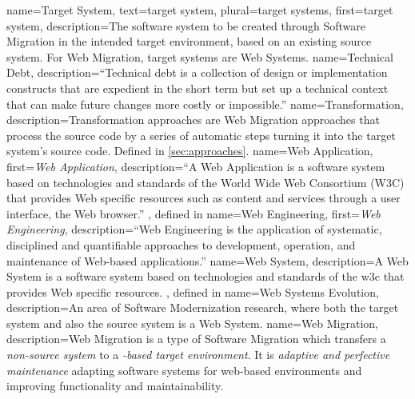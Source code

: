 {
  name=Target System,
  text=target system,
  plural=target systems,
  first={target system}, 
  description={The software system to be created through \gls{Software Migration} in the intended \gls{target environment}, based on an existing \gls{source system}. For \gls{Web Migration}, target systems are \glspl{Web System}.}
}
 {
  name=Technical Debt,
  description={``Technical debt is a collection of design or implementation constructs that are expedient in the short term but set up a technical context that can make future changes more costly or impossible.'' \autocite{Avgeriou2016TD}}
}
 {
  name=Transformation,
  description={Transformation approaches are \gls{Web Migration} approaches that process the  source code by a series of automatic steps turning it into the target system's source code. Defined in \cref{sec:approaches}}.
}
 {
  name=Web Application,
  first={\emph{Web Application}},
  description={``A Web Application is a software system based on technologies and standards of the World Wide Web Consortium (W3C) that provides Web specific resources such as content and services through a user interface, the Web browser.'' \autocite{Kappel2006WebEngineering}, defined in }
}
 {
  name=Web Engineering,
  first={\emph{Web Engineering}},
  description={``Web Engineering is the application of systematic, disciplined and quantifiable approaches to development, operation, and maintenance of Web-based applications.'' \autocite{Deshpande2002WebEngineering}}
}
 {
  name=Web System,
  description={A Web System is a software system based on technologies and standards of the \gls{w3c} that provides Web specific resources. \autocite[adapted from][]{Gaedke2000Diss,Kappel2006WebEngineering}, defined in }
}
 {
  name=Web Systems Evolution,
  description={An area of \gls{Software Modernization} research, where both the target system and also the source system is a \gls{Web System}. \autocite[cf.][]{Kienle2014EvolutionWeb}}
}
 {
  name=Web Migration,
  description={Web Migration is a type of \gls{Software Migration} which transfers a \emph{non-\web source system} to a \emph{\web-based target environment}. It is \emph{adaptive and perfective maintenance} adapting software systems for web-based environments and improving functionality and maintainability. \autocite{ISO/IEEE2006SoftwareLifeCycle}}
}
